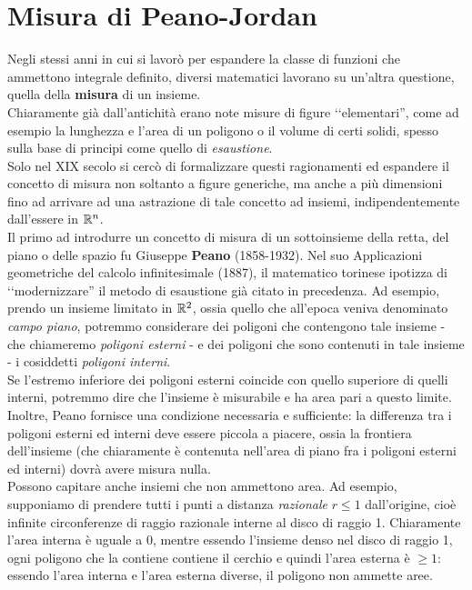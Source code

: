 \section{Misura di Peano-Jordan}
Negli stessi anni in cui si lavorò per espandere la classe di funzioni che ammettono integrale definito, diversi matematici lavorano su un'altra questione, quella della \textbf{misura} di un insieme.\\
Chiaramente già dall'antichità erano note misure di figure ‘‘elementari'', come ad esempio la lunghezza e l'area di un poligono o il volume di certi solidi, spesso sulla base di principi come quello di \textit{esaustione}.\\
Solo nel XIX secolo si cercò di formalizzare questi ragionamenti ed espandere il concetto di misura non soltanto a figure generiche, ma anche a più dimensioni fino ad arrivare ad una astrazione di tale concetto ad insiemi, indipendentemente dall'essere in $\mathbb{R}^n$.\\
Il primo ad introdurre un concetto di misura di un sottoinsieme della retta, del piano o delle spazio fu Giuseppe \textbf{Peano} (1858-1932). Nel suo Applicazioni geometriche del
calcolo infinitesimale (1887), il matematico torinese ipotizza di ‘‘modernizzare'' il metodo di esaustione già citato in precedenza.
Ad esempio, prendo un insieme limitato in $\mathbb{R}^2$, ossia quello che all'epoca veniva denominato \textit{campo piano}, potremmo considerare dei poligoni che contengono tale insieme - che chiameremo \textit{poligoni esterni} - e dei poligoni che sono contenuti in tale insieme - i cosiddetti \textit{poligoni interni}.\\
Se l'estremo inferiore dei poligoni esterni coincide con quello superiore di quelli interni, potremmo dire che l'insieme è misurabile e ha area pari a questo limite.
Inoltre, Peano fornisce una condizione necessaria e sufficiente: la differenza tra i poligoni esterni ed interni deve essere piccola a piacere, ossia la frontiera dell'insieme (che chiaramente è contenuta nell'area di piano fra i poligoni esterni ed interni) dovrà avere misura nulla.\\
Possono capitare anche insiemi che non ammettono area. Ad esempio, supponiamo di prendere tutti i punti a distanza \textit{razionale} $r\leq 1$ dall'origine, cioè infinite circonferenze di raggio razionale interne al disco di raggio 1.
Chiaramente l'area interna è uguale a 0, mentre essendo l'insieme denso nel disco di raggio 1, ogni poligono che la contiene contiene il cerchio e quindi l'area esterna è $\geq 1$: essendo l'area interna e l'area esterna diverse, il poligono non ammette aree.\\
